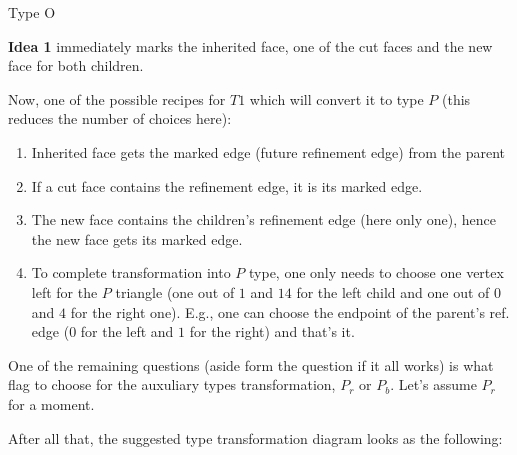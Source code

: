 \documentclass[a4paper,12pt]{amsart}
\numberwithin{equation}{section}
\begin{document}
\begin{itemize}
\begin{center}
Type O    
\end{center}
    
    \textbf{Idea 1} immediately marks the inherited face, one of the cut faces and the new face for both children.
    
    Now, one of the possible recipes for $T1$ which will convert it to type $P$ (this reduces the number of choices here):
    	\begin{enumerate}
		\item Inherited face gets the marked edge (future refinement edge) from the parent
		\item If a cut face contains the refinement edge, it is its marked edge.
		\item The new face contains the children's refinement edge (here only one), hence the new face gets its marked edge.
		\item To complete transformation into $P$ type, one only needs to choose one vertex left for the $P$ triangle (one out of $1$ and $14$ for the left child and one out of $0$ and $4$ for the right one). E.g., one can choose the endpoint of the parent's ref. edge ($0$ for the left and $1$ for the right) and that's it.
	\end{enumerate}	
	
\end{itemize}

One of the remaining questions (aside form the question if it all works) is what flag to choose for the auxuliary types transformation, $P_r$ or $P_b$. Let's assume $P_r$ for a moment.

After all that, the suggested type transformation diagram looks as the following:
\end{document}
